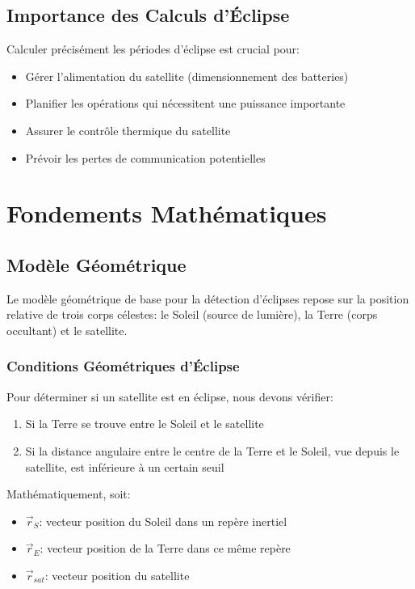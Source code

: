 \documentclass[12pt,a4paper]{article}
\begin{document}
\subsection{Importance des Calculs d'Éclipse}

Calculer précisément les périodes d'éclipse est crucial pour:
\begin{itemize}
    \item Gérer l'alimentation du satellite (dimensionnement des batteries)
    \item Planifier les opérations qui nécessitent une puissance importante
    \item Assurer le contrôle thermique du satellite
    \item Prévoir les pertes de communication potentielles
\end{itemize}

\section{Fondements Mathématiques}

\subsection{Modèle Géométrique}

Le modèle géométrique de base pour la détection d'éclipses repose sur la position relative de trois corps célestes: le Soleil (source de lumière), la Terre (corps occultant) et le satellite.

\subsubsection{Conditions Géométriques d'Éclipse}

Pour déterminer si un satellite est en éclipse, nous devons vérifier:

\begin{enumerate}
    \item Si la Terre se trouve entre le Soleil et le satellite
    \item Si la distance angulaire entre le centre de la Terre et le Soleil, vue depuis le satellite, est inférieure à un certain seuil
\end{enumerate}

Mathématiquement, soit:
\begin{itemize}
    \item $\vec{r}_S$: vecteur position du Soleil dans un repère inertiel
    \item $\vec{r}_E$: vecteur position de la Terre dans ce même repère
    \item $\vec{r}_{sat}$: vecteur position du satellite
\end{itemize}
\end{document}
